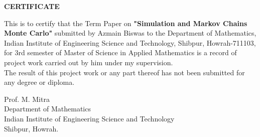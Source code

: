 \vspace{10cm}
\begin{center}
    \LARGE{\textbf{CERTIFICATE}}
\end{center}
\large
\vspace*{2cm}
This is to certify that the Term Paper on \textbf{"Simulation and Markov Chains Monte Carlo"} submitted by Azmain Biswas to the Department of Mathematics, Indian Institute of Engineering Science and Technology, Shibpur, Howrah-711103, for 3rd semester of Master of Science in Applied Mathematics is a record of project work carried out by him under my supervision. \\
The result of this project work or any part thereof has not been submitted for any degree or diploma.
\vspace{4cm}
\begin{flushright}
    Prof. M. Mitra\\
    Department of Mathematics\\
    Indian Institute of Engineering Science and Technology\\
    Shibpur, Howrah.
\end{flushright}
